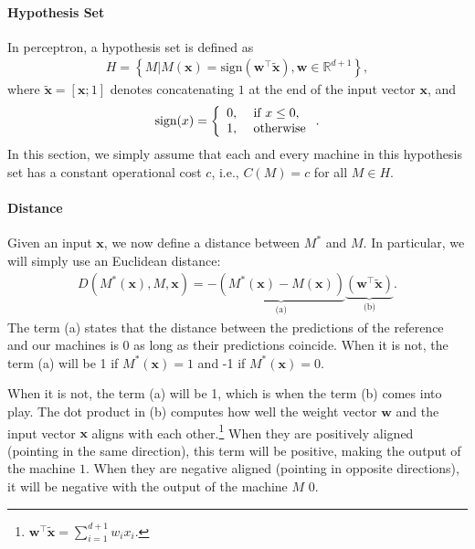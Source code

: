 \documentclass{report}
\newcommand{\vect}[1]{\mathbf{#1}}
\newcommand{\vx}[0]{\vect{x}}
\newcommand{\vw}[0]{\vect{w}}
\newcommand{\sign}{\text{sign}}
\begin{document}
\paragraph{Hypothesis Set}

In perceptron, a hypothesis set is defined as
\begin{align*}
    H = \left\{ 
    M | M(\vx) = \sign(\vw^\top \tilde{\vx}), \vw \in \mathbb{R}^{d+1}
    \right\},
\end{align*}
where $\tilde{\vx} = \left[ \vx; 1\right]$ denotes concatenating $1$ at the end
of the input vector $\vx$, and 
\begin{align*}
    \sign(x) = \left\{ \begin{array}{l l}
            0,&\text{ if } x \leq 0, \\
            1,&\text{ otherwise}
        \end{array}
        \right..
\end{align*}
In this section, we simply assume that each and every machine in this hypothesis
set has a constant operational cost $c$, i.e., $C(M)=c$ for all $M\in H$. 

\paragraph{Distance}

Given an input $\vx$, we now define a distance between $M^*$ and $M$. In
particular, we will simply use an Euclidean distance:
\begin{align}
    \label{eq:perceptron_dist}
    D(M^*(\vx), M, \vx) = -\underbrace{\left( M^*(\vx) - M(\vx)
    \right)}_{\text{(a)}} \underbrace{\left(\vw^\top
    \tilde{\vx}\right)}_{\text{(b)}}.
\end{align}
The term (a) states that the distance between the predictions of the reference
and our machines is $0$ as long as their predictions coincide. When it is not,
the term (a) will be 1 if $M^*(\vx) = 1$ and -1 if $M^*(\vx) = 0$.

When it is not, the term (a) will be 1, which is when the term (b) comes into
play. The dot product in (b) computes how well the weight vector $\vw$ and the
input vector $\vx$ aligns with each other.\footnote{
    $\vw^\top \tilde{\vx} = \sum_{i=1}^{d+1} w_i x_i$.
} When they are positively aligned (pointing in the same direction), this term
will be positive, making the output of the machine $1$. When they are negative
aligned (pointing in opposite directions), it will be negative with the output
of the machine $M$ $0$.
\end{document}
